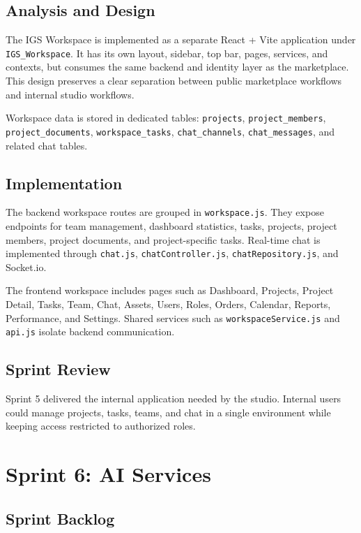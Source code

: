 \subsection{Analysis and Design}

The IGS Workspace is implemented as a separate React + Vite application under
\texttt{IGS\_Workspace}. It has its own layout, sidebar, top bar, pages, services, and
contexts, but consumes the same backend and identity layer as the marketplace. This design
preserves a clear separation between public marketplace workflows and internal studio
workflows.

Workspace data is stored in dedicated tables: \texttt{projects}, \texttt{project\_members},
\texttt{project\_documents}, \texttt{workspace\_tasks}, \texttt{chat\_channels},
\texttt{chat\_messages}, and related chat tables.

\subsection{Implementation}

The backend workspace routes are grouped in \texttt{workspace.js}. They expose endpoints for
team management, dashboard statistics, tasks, projects, project members, project documents,
and project-specific tasks. Real-time chat is implemented through \texttt{chat.js},
\texttt{chatController.js}, \texttt{chatRepository.js}, and Socket.io.

The frontend workspace includes pages such as Dashboard, Projects, Project Detail, Tasks,
Team, Chat, Assets, Users, Roles, Orders, Calendar, Reports, Performance, and Settings.
Shared services such as \texttt{workspaceService.js} and \texttt{api.js} isolate backend
communication.

\subsection{Sprint Review}

Sprint 5 delivered the internal application needed by the studio. Internal users could
manage projects, tasks, teams, and chat in a single environment while keeping access
restricted to authorized roles.

\section{Sprint 6: AI Services}

\subsection{Sprint Backlog}

